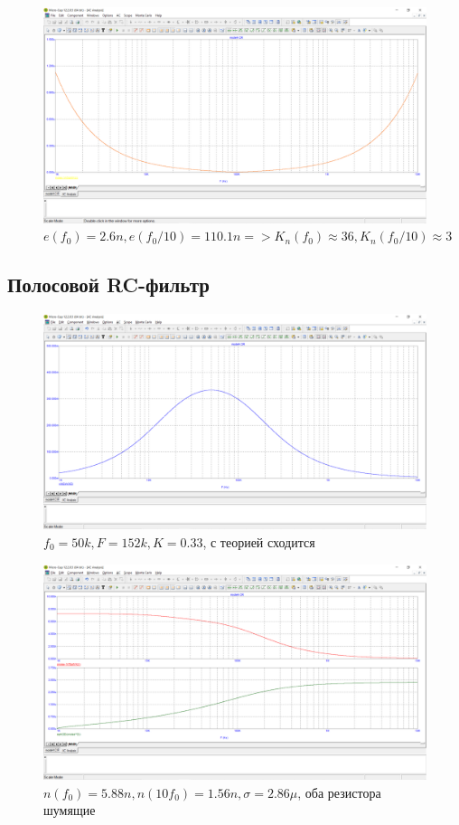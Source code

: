 \documentclass[a4paper, 12pt]{article}%
\begin{document}
\begin{figure}[h!]
    \centering
    \includegraphics[scale = 0.4 \textwidth]{images/mod4_1_3.png}
    \caption{$e(f_0) = 2.6n, e(f_0/10) = 110.1n => K_n(f_0) \approx 36, K_n(f_0/10) \approx 3$}
    \label{fig:m413}
\end{figure}
\FloatBarrier
\subsection{Полосовой RC-фильтр}
\FloatBarrier
\begin{figure}
    \centering
    \includegraphics[scale = 0.4 \textwidth]{images/mod4_2_1.png}
    \caption{$f_0 = 50k, F = 152k, K = 0.33$, с теорией сходится}
    \label{fig:m421}
\end{figure}

\begin{figure}
    \centering
    \includegraphics[scale = 0.4 \textwidth]{images/mod4_2_2_1.png}
    \caption{$n(f_0) = 5.88n, n(10 f_0) = 1.56n, \sigma = 2.86\mu$, оба резистора шумящие}
    \label{fig:m4221}
\end{figure}
\end{document}
